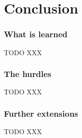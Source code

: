 \part{Conclusion}
\label{part:conclusion}


\section{What is learned}
\label{section:con_achieved}

TODO XXX


\section{The hurdles}
\label{section:con_hurdles}

TODO XXX


\section{Further extensions}
\label{section:con_extensions}

TODO XXX